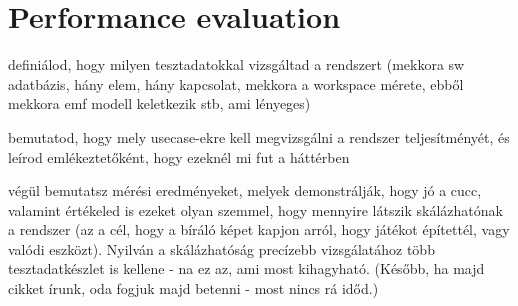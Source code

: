 \section{Performance evaluation}


 definiálod, hogy milyen tesztadatokkal vizsgáltad a rendszert 
 (mekkora sw adatbázis, 
 hány elem, 
 hány kapcsolat, 
 mekkora a workspace mérete, 
 ebből mekkora emf modell keletkezik stb, ami lényeges)


 bemutatod, hogy mely usecase-ekre kell megvizsgálni a rendszer teljesítményét,
 és leírod emlékeztetőként, hogy ezeknél mi fut a háttérben
 
 végül bemutatsz mérési eredményeket, melyek demonstrálják, hogy jó a cucc,
 valamint értékeled is ezeket olyan szemmel, hogy mennyire látszik skálázhatónak
  a rendszer (az a cél, hogy a bíráló képet kapjon arról, hogy játékot
  építettél, vagy valódi eszközt). Nyilván a skálázhatóság precízebb
  vizsgálatához több tesztadatkészlet is kellene - na ez az, ami most
  kihagyható. (Később, ha majd cikket írunk, oda fogjuk majd betenni - most
  nincs rá időd.) 
 
















